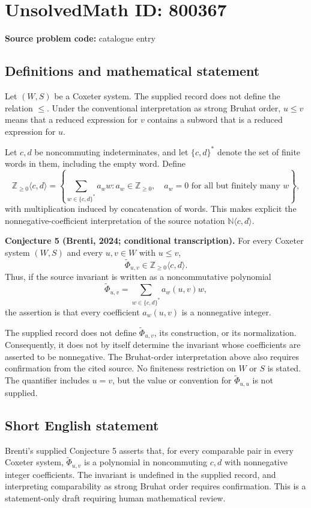\documentclass[11pt]{article}
\begin{document}
\section*{UnsolvedMath ID: 800367}
\textbf{Source problem code:} catalogue entry
\subsection{Definitions and mathematical statement}
Let \((W,S)\) be a Coxeter system. The supplied record does not define the relation \(\leq\). Under the conventional interpretation as strong Bruhat order, \(u\leq v\) means that a reduced expression for \(v\) contains a subword that is a reduced expression for \(u\).

Let \(c,d\) be noncommuting indeterminates, and let \(\{c,d\}^{*}\) denote the set of finite words in them, including the empty word. Define
\[
\mathbb{Z}_{\geq 0}\langle c,d\rangle
=
\left\{\sum_{w\in\{c,d\}^{*}} a_w w:
 a_w\in\mathbb{Z}_{\geq 0},\quad
 a_w=0\text{ for all but finitely many }w\right\},
\]
with multiplication induced by concatenation of words. This makes explicit the nonnegative-coefficient interpretation of the source notation \(\mathbb{N}\langle c,d\rangle\).

\textbf{Conjecture 5 (Brenti, 2024; conditional transcription).}
For every Coxeter system \((W,S)\) and every \(u,v\in W\) with \(u\leq v\),
\[
\widetilde{\Phi}_{u,v}\in\mathbb{Z}_{\geq 0}\langle c,d\rangle.
\]
Thus, if the source invariant is written as a noncommutative polynomial
\[
\widetilde{\Phi}_{u,v}=\sum_{w\in\{c,d\}^{*}} a_w(u,v)w,
\]
the assertion is that every coefficient \(a_w(u,v)\) is a nonnegative integer.

The supplied record does not define \(\widetilde{\Phi}_{u,v}\), its construction, or its normalization. Consequently, it does not by itself determine the invariant whose coefficients are asserted to be nonnegative. The Bruhat-order interpretation above also requires confirmation from the cited source. No finiteness restriction on \(W\) or \(S\) is stated. The quantifier includes \(u=v\), but the value or convention for \(\widetilde{\Phi}_{u,u}\) is not supplied.
\subsection{Short English statement}
Brenti's supplied Conjecture 5 asserts that, for every comparable pair in every Coxeter system, \(\widetilde{\Phi}_{u,v}\) is a polynomial in noncommuting \(c,d\) with nonnegative integer coefficients. The invariant is undefined in the supplied record, and interpreting comparability as strong Bruhat order requires confirmation. This is a statement-only draft requiring human mathematical review.
\end{document}
